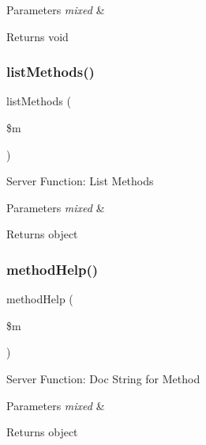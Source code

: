 \begin{DoxyParams}{Parameters}
{\em mixed} & \\
\hline
\end{DoxyParams}
\begin{DoxyReturn}{Returns}
void 
\end{DoxyReturn}
\mbox{\label{class_c_i___xmlrpcs_ad640f0b44d1956a05cfe40bab4e4043d}} 
\subsubsection{\texorpdfstring{list\+Methods()}{listMethods()}}
{\footnotesize\ttfamily list\+Methods (\begin{DoxyParamCaption}\item[{}]{\$m }\end{DoxyParamCaption})}

Server Function\+: List Methods


\begin{DoxyParams}{Parameters}
{\em mixed} & \\
\hline
\end{DoxyParams}
\begin{DoxyReturn}{Returns}
object 
\end{DoxyReturn}
\mbox{\label{class_c_i___xmlrpcs_a97626f30e860f4a63463f8674827dc00}} 
\subsubsection{\texorpdfstring{method\+Help()}{methodHelp()}}
{\footnotesize\ttfamily method\+Help (\begin{DoxyParamCaption}\item[{}]{\$m }\end{DoxyParamCaption})}

Server Function\+: Doc String for Method


\begin{DoxyParams}{Parameters}
{\em mixed} & \\
\hline
\end{DoxyParams}
\begin{DoxyReturn}{Returns}
object 
\end{DoxyReturn}
\mbox{\label{class_c_i___xmlrpcs_a9f96cc0bd3338094174eb22cd90d6f2a}} 
